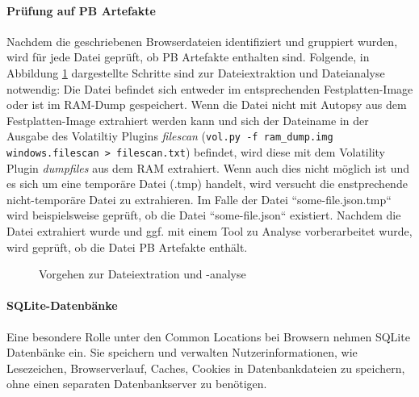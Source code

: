\paragraph*{Prüfung auf PB Artefakte}
Nachdem die geschriebenen Browserdateien identifiziert und gruppiert wurden, wird für jede Datei geprüft, ob PB Artefakte enthalten sind. Folgende, in Abbildung \ref{img:dateiextraktion-und-analyse} dargestellte Schritte sind zur Dateiextraktion und Dateianalyse notwendig:
Die Datei befindet sich entweder im entsprechenden Festplatten-Image oder ist im RAM-Dump gespeichert. 
Wenn die Datei nicht mit Autopsy aus dem Festplatten-Image extrahiert werden kann und sich der Dateiname in der Ausgabe des Volatiltiy Plugins \textit{filescan} (\texttt{vol.py -f ram\_dump.img windows.filescan > filescan.txt}) befindet, wird diese mit dem Volatility Plugin \textit{dumpfiles} aus dem RAM extrahiert.
Wenn auch dies nicht möglich ist und es sich um eine temporäre Datei (.tmp) handelt, wird versucht die enstprechende nicht-temporäre Datei zu extrahieren. 
Im Falle der Datei ``some-file.json.tmp`` wird beispielsweise geprüft, ob die Datei ``some-file.json`` existiert.
Nachdem die Datei extrahiert wurde und ggf. mit einem Tool zu Analyse vorberarbeitet wurde, wird geprüft, ob die Datei PB Artefakte enthält.
\begin{figure}[h!]
	\centering
	\small
	\centerline{\resizebox{\linewidth}{!}{}}
	\caption{Vorgehen zur Dateiextration und -analyse}
	\label{img:dateiextraktion-und-analyse}
\end{figure}

\paragraph*{SQLite-Datenbänke}
\label{subsubsection:methodik-datenanalyse-commonlocations-sqlitedbs}
Eine besondere Rolle unter den Common Locations bei Browsern nehmen SQLite Datenbänke ein. 
Sie speichern und verwalten Nutzerinformationen, wie Lesezeichen, Browserverlauf, Caches, Cookies in Datenbankdateien zu speichern, ohne einen separaten Datenbankserver zu benötigen.

